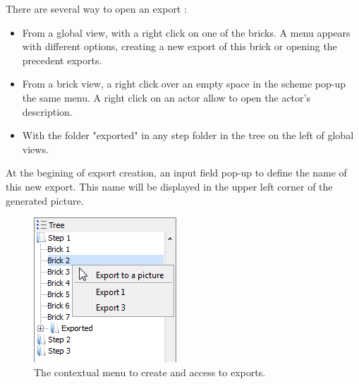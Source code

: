 There are several way to open an export :\\
\begin{itemize}
\item From a global view, with a right click on one of the bricks. A menu appears with different options, creating a new export of this brick or opening the precedent exports.\\
\item From a brick view, a right click over an empty space in the scheme pop-up the same menu. A right click on an actor allow to open the actor's description. 
\item With the folder "exported" in any step folder in the tree on the left of global views.
\end{itemize}

At the begining of export creation, an input field pop-up to define the name of this new export. This name will be displayed in the upper left corner of the generated picture.\\



\begin{figure}[h!]
\centering
\includegraphics[scale=0.75]{images/menu_export.png}
\caption{The contextual menu to create and access to exports.}
\end{figure}

